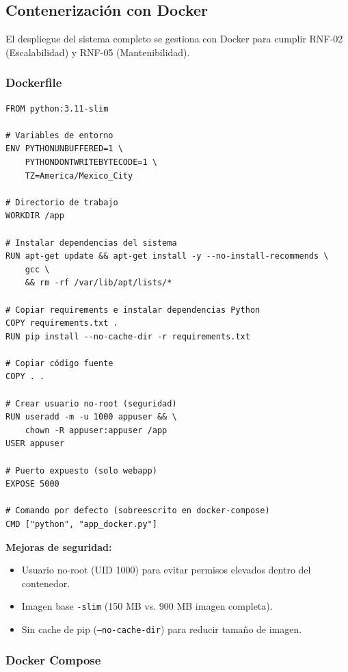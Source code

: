 \subsection{Contenerización con Docker}
\label{subsec:impl_docker}

El despliegue del sistema completo se gestiona con Docker para cumplir RNF-02 (Escalabilidad) y RNF-05 (Mantenibilidad).

\subsubsection{Dockerfile}

\begin{lstlisting}[language=docker, caption={Dockerfile multi-stage del P2}]
FROM python:3.11-slim

# Variables de entorno
ENV PYTHONUNBUFFERED=1 \
    PYTHONDONTWRITEBYTECODE=1 \
    TZ=America/Mexico_City

# Directorio de trabajo
WORKDIR /app

# Instalar dependencias del sistema
RUN apt-get update && apt-get install -y --no-install-recommends \
    gcc \
    && rm -rf /var/lib/apt/lists/*

# Copiar requirements e instalar dependencias Python
COPY requirements.txt .
RUN pip install --no-cache-dir -r requirements.txt

# Copiar código fuente
COPY . .

# Crear usuario no-root (seguridad)
RUN useradd -m -u 1000 appuser && \
    chown -R appuser:appuser /app
USER appuser

# Puerto expuesto (solo webapp)
EXPOSE 5000

# Comando por defecto (sobreescrito en docker-compose)
CMD ["python", "app_docker.py"]
\end{lstlisting}

\textbf{Mejoras de seguridad:}
\begin{itemize}
    \item Usuario no-root (UID 1000) para evitar permisos elevados dentro del contenedor.
    \item Imagen base \texttt{-slim} (150 MB vs. 900 MB imagen completa).
    \item Sin cache de pip (\texttt{--no-cache-dir}) para reducir tamaño de imagen.
\end{itemize}

\subsubsection{Docker Compose}

